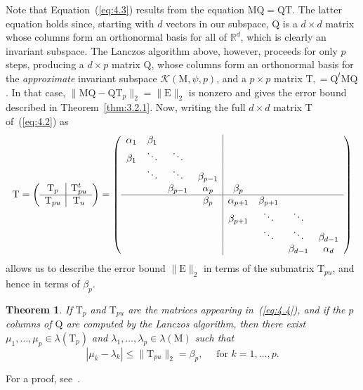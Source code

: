 \documentclass[12pt,letterpaper]{report}
\theoremstyle{plain}
\newtheorem{theorem}{Theorem}[chapter]
\theoremstyle{definition}
\theoremstyle{remark}
\numberwithin{theorem}{chapter}
\numberwithin{claim}{chapter}
\numberwithin{equation}{chapter}
\numberwithin{conjecture}{chapter}
\newcommand\sK{\ensuremath{\mathcal{K}}}
\newcommand\R{\ensuremath{\mathbb{R}}}
\newcommand\M{\ensuremath{\mathrm{M}}}
\newcommand\T{\ensuremath{\mathrm{T}}}
\newcommand\Q{\ensuremath{\mathrm{Q}}}
\newcommand\E{\ensuremath{\mathrm{E}}}
\newcommand\<{\ensuremath{\langle}}
\renewcommand\>{\ensuremath{\rangle}}
\begin{document}
Note that Equation~(\ref{eq:4.3}) results from the equation $\M\Q = \Q\T$. The latter equation holds
since, starting with $d$ vectors in our subspace, $\Q$ is a $d \times d$ matrix
whose columns form an orthonormal basis for all of $\R^d$, which is clearly an
invariant subspace. The Lanczos algorithm above, however, 
%
%
%
%
proceeds for only $p$ steps, producing a $d \times p$ matrix $\Q$, whose columns
form an orthonormal basis for the \emph{approximate} invariant subspace 
$\sK(\M, \psi, p)$, and a $p \times p$ matrix $\T, = \Q^t\M\Q$. In that case,
$\|\M\Q - \Q\T_p\|_2 = \|\E\|_2$ is nonzero and gives the error bound described
in Theorem~\ref{thm:3.2.1}. Now, writing the full $d \times d$ matrix $\T$
of~(\ref{eq:4.2}) as
\begin{equation}
  \label{eq:4.4}
\T = 
\left( \begin{array}{c|c}
\T_p & \T_{pu}^t \\
 \hline
\T_{pu} & \T_{u}
\end{array}
\right)
=
\left( \begin{array}{cccc|cccc}
\alpha_1 & \beta_1 &      &                 & & && \\
\beta_1 & \ddots  & \ddots&                 & & && \\
        & \ddots  & \ddots  & \beta_{p-1}    &          & && \\
        &         & \beta_{p-1}  & \alpha_{p} & \beta_{p}& && \\
\hline
        &         &             & \beta_{p}  & \alpha_{p+1} & \beta_{p+1} && \\
        &         &             &           & \beta_{p+1}  & \ddots & \ddots &\\
        &         &             &           &             & \ddots & \ddots &\beta_{d-1} \\
        &         &             &           &             &        & \beta_{d-1} &\alpha_{d}
\end{array}
\right)
\end{equation}
allows us to describe the error bound $\|\E\|_2$ in terms of the submatrix
$\T_{pu}$, and hence in terms of $\beta_p$.
\begin{theorem}
\label{thm:4.1.1}
If $\T_p$ and $\T_{pu}$ are the matrices appearing in~(\ref{eq:4.4}), and if the $p$
columns of $\Q$ are computed by the 
Lanczos algorithm, then there exist $\mu_1, \dots, \mu_p \in \lambda(\T_p)$ and 
$\lambda_1, \dots, \lambda_p \in \lambda(\M)$
such that
\[
|\mu_k - \lambda_k| \leq \|\T_{pu}\|_2 = \beta_p, \quad \text{ for $k=1,\dots,p$.}
\]
\end{theorem}
For a proof, see~\cite[Page 365]{Demmel:1997}.
%
%
%
%
\end{document}
